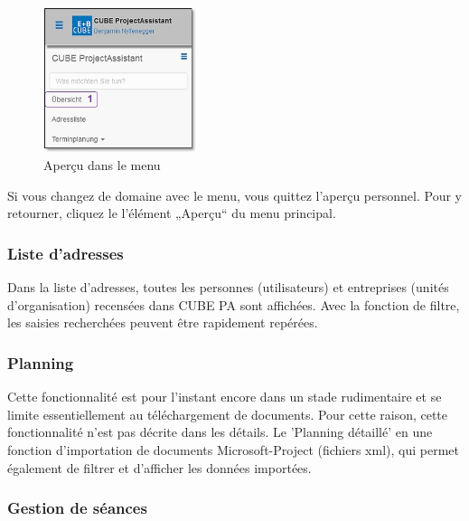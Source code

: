 \vspace{\baselineskip}

\begin{figure}
  \vspace{-45pt}
  \begin{center}
    \includegraphics[width=0.4\textwidth]{../chapters/01_Einfuehrung/pictures/1-3-2_MenuepunktUebersicht.jpg}
  \end{center}
  \vspace{-20pt}
  \caption{Aperçu dans le menu}
  \vspace{-10pt}
\end{figure}
Si vous changez de domaine avec le menu, vous quittez l'aperçu personnel. Pour y retourner, cliquez le l'élément „Aperçu“  du menu principal.

\pagebreak
\subsubsection{Liste d'adresses}

Dans la liste d'adresses, toutes les personnes (utilisateurs) et entreprises (unités d'organisation) recensées dans CUBE PA sont affichées. Avec la fonction de filtre, les saisies recherchées peuvent être rapidement repérées.

\subsubsection{Planning}

Cette fonctionnalité est pour l'instant encore dans un stade rudimentaire et se limite essentiellement au téléchargement de documents. Pour cette raison, cette fonctionnalité n'est pas décrite dans les détails. Le 'Planning détaillé' en une fonction d'importation de documents Microsoft-Project (fichiers xml), qui permet également de filtrer et d'afficher les données importées.

\subsubsection{Gestion de séances}


